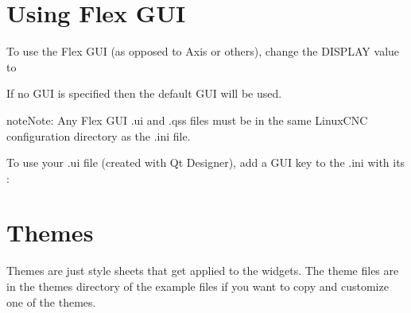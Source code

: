 \documentclass[letterpaper,10pt,english]{sphinxmanual}
\begin{document}
\section{Using Flex GUI}
\label{\detokenize{ini:using-flex-gui}}\label{\detokenize{ini:using-flexgui}}
\sphinxAtStartPar
To use the Flex GUI (as opposed to Axis or others), change the DISPLAY value to

\begin{sphinxVerbatim}[commandchars=\\\{\}]
  
\end{sphinxVerbatim}

\sphinxAtStartPar
If no GUI is specified then the default GUI will be used.

\begin{sphinxadmonition}{note}{Note:}
\sphinxAtStartPar
Any Flex GUI .ui and .qss files must be in the same LinuxCNC
configuration directory as the .ini file.
\end{sphinxadmonition}

\sphinxAtStartPar
To use your .ui file (created with Qt Designer), add a GUI key to the .ini
with its :

\begin{sphinxVerbatim}[commandchars=\\\{\}]
  
\end{sphinxVerbatim}


\section{Themes}
\label{\detokenize{ini:themes}}\label{\detokenize{ini:installed-themes}}
\sphinxAtStartPar
Themes are just style sheets that get applied to the widgets. The theme files
are in the themes directory of the example files if you want to copy and
customize one of the themes.

\begin{sphinxVerbatim}[commandchars=\\\{\}]
\end{sphinxVerbatim}
\end{document}
